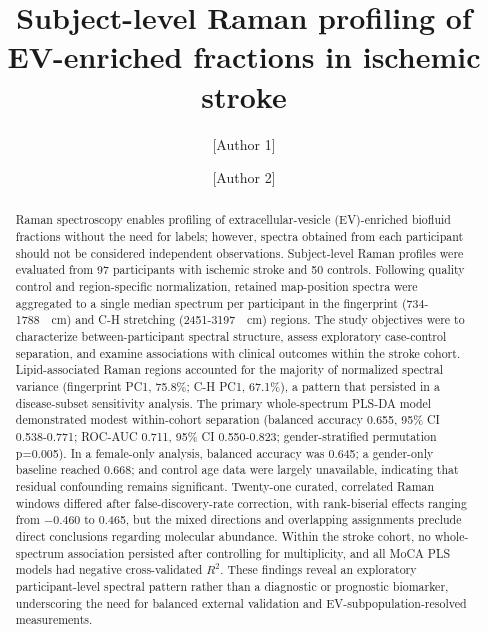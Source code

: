 \documentclass[preprint,12pt]{elsarticle}
\begin{document}
\begin{frontmatter}

\title{Subject-level Raman profiling of EV-enriched fractions in ischemic stroke}


\author[1]{[Author 1]}   \author[1,2]{[Author 2]}

 

\begin{abstract}
Raman spectroscopy enables profiling of extracellular-vesicle (EV)-enriched biofluid fractions without the need for labels; however, spectra obtained from each participant should not be considered independent observations. Subject-level Raman profiles were evaluated from 97 participants with ischemic stroke and 50 controls. Following quality control and region-specific normalization, retained map-position spectra were aggregated to a single median spectrum per participant in the fingerprint (734-1788~\si{\per\centi\metre}) and C-H stretching (2451-3197~\si{\per\centi\metre}) regions. The study objectives were to characterize between-participant spectral structure, assess exploratory case-control separation, and examine associations with clinical outcomes within the stroke cohort. Lipid-associated Raman regions accounted for the majority of normalized spectral variance (fingerprint PC1, 75.8\%; C-H PC1, 67.1\%), a pattern that persisted in a disease-subset sensitivity analysis. The primary whole-spectrum PLS-DA model demonstrated modest within-cohort separation (balanced accuracy 0.655, 95\% CI 0.538-0.771; ROC-AUC 0.711, 95\% CI 0.550-0.823; gender-stratified permutation p=0.005). In a female-only analysis, balanced accuracy was 0.645; a gender-only baseline reached 0.668; and control age data were largely unavailable, indicating that residual confounding remains significant. Twenty-one curated, correlated Raman windows differed after false-discovery-rate correction, with rank-biserial effects ranging from $-0.460$ to 0.465, but the mixed directions and overlapping assignments preclude direct conclusions regarding molecular abundance. Within the stroke cohort, no whole-spectrum association persisted after controlling for multiplicity, and all MoCA PLS models had negative cross-validated $R^2$. These findings reveal an exploratory participant-level spectral pattern rather than a diagnostic or prognostic biomarker, underscoring the need for balanced external validation and EV-subpopulation-resolved measurements.


\end{abstract}
\end{frontmatter}
\end{document}
